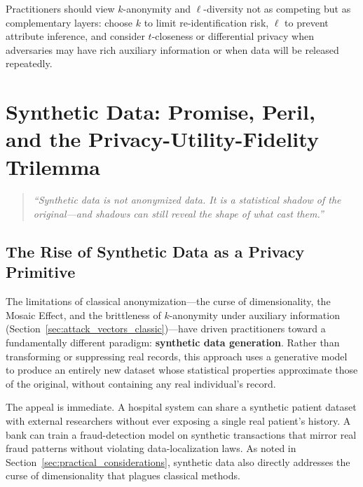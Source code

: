 Practitioners should view $k$-anonymity and $\ell$-diversity not as competing but as complementary layers: choose $k$ to limit re-identification risk, $\ell$ to prevent attribute inference, and consider $t$-closeness or differential privacy when adversaries may have rich auxiliary information or when data will be released repeatedly.

\section{Synthetic Data: Promise, Peril, and the
         Privacy-Utility-Fidelity Trilemma}
\label{sec:synthetic-data}

\begin{quote}
\textit{``Synthetic data is not anonymized data. It is a statistical
shadow of the original---and shadows can still reveal the shape of
what cast them.''}
\end{quote}

\subsection{The Rise of Synthetic Data as a Privacy Primitive}
\label{subsec:synth-rise}

The limitations of classical anonymization---the curse of
dimensionality, the Mosaic Effect, and the brittleness of
$k$-anonymity under auxiliary information (Section~\ref{sec:attack_vectors_classic})---have
driven practitioners toward a fundamentally different paradigm:
\textbf{synthetic data generation}.
Rather than transforming or suppressing real records, this approach
uses a generative model to produce an entirely new dataset whose
statistical properties approximate those of the original, without
containing any real individual's record.

The appeal is immediate.
A hospital system can share a synthetic patient dataset with external
researchers without ever exposing a single real patient's history.
A bank can train a fraud-detection model on synthetic transactions
that mirror real fraud patterns without violating data-localization
laws.
As noted in Section~\ref{sec:practical_considerations}, synthetic
data also directly addresses the curse of dimensionality that plagues
classical methods.


